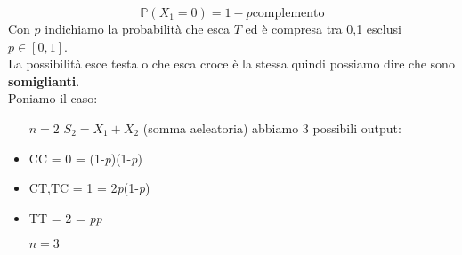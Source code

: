 $$ \mathbb{P}(X_1=0) = 1-\textit{p} \text{complemento}$$
Con $\textit{p}$ indichiamo la probabilità che esca $T$ ed è compresa tra 0,1 esclusi $\textit{p} \in [0,1]$.\\
La possibilità esce testa o che esca croce è la stessa quindi possiamo dire che sono \textbf{somiglianti}.\\
Poniamo il caso:
\begin{itemize}
\item[$n=2$] $S_2=X_1+X_2$ (somma aeleatoria) abbiamo 3 possibili output:
\item CC = 0 = (1-\textit{p})(1-\textit{p})
\item CT,TC = 1 = 2\textit{p}(1-\textit{p})
\item TT = 2 = \textit{p}\textit{p}
\item[$n=3$]
\end{itemize}





